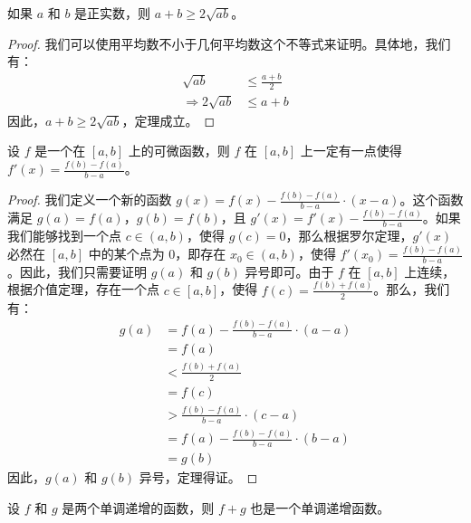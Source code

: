 \begin{cor}
  如果 $a$ 和 $b$ 是正实数，则 $a+b \geq 2\sqrt{ab}$。
\end{cor}

\begin{proof}
  我们可以使用平均数不小于几何平均数这个不等式来证明。具体地，我们有：
  \begin{align*}
    \sqrt{ab}              & \leq \frac{a+b}{2} \\
    \Rightarrow 2\sqrt{ab} & \leq a+b           
  \end{align*}
  因此，$a+b \geq 2\sqrt{ab}$，定理成立。
\end{proof}

\begin{lem}
  设 $f$ 是一个在 $[a,b]$ 上的可微函数，则 $f$ 在 $[a,b]$ 上一定有一点使得 $f'(x) = \frac{f(b)-f(a)}{b-a}$。
\end{lem}

\begin{proof}
  我们定义一个新的函数 $g(x) = f(x) - \frac{f(b)-f(a)}{b-a} \cdot (x-a)$。这个函数满足 $g(a) = f(a)$，$g(b) = f(b)$，且 $g'(x) = f'(x) - \frac{f(b)-f(a)}{b-a}$。如果我们能够找到一个点 $c \in (a,b)$，使得 $g(c) = 0$，那么根据罗尔定理，$g'(x)$ 必然在 $[a,b]$ 中的某个点为 $0$，即存在 $x_0 \in (a,b)$，使得 $f'(x_0) = \frac{f(b)-f(a)}{b-a}$。因此，我们只需要证明 $g(a)$ 和 $g(b)$ 异号即可。由于 $f$ 在 $[a,b]$ 上连续，根据介值定理，存在一个点 $c \in [a,b]$，使得 $f(c) = \frac{f(b)+f(a)}{2}$。那么，我们有：
  \begin{align*}
    g(a) & = f(a) - \frac{f(b)-f(a)}{b-a} \cdot (a-a) \\
         & = f(a)                                     \\
         & < \frac{f(b)+f(a)}{2}                      \\
         & = f(c)                                     \\
         & > \frac{f(b)-f(a)}{b-a} \cdot (c-a)        \\
         & = f(a) - \frac{f(b)-f(a)}{b-a} \cdot (b-a) \\
         & = g(b)                                     
  \end{align*}
  因此，$g(a)$ 和 $g(b)$ 异号，定理得证。
\end{proof}

\begin{prop}
  设 $f$ 和 $g$ 是两个单调递增的函数，则 $f+g$ 也是一个单调递增函数。
\end{prop}

